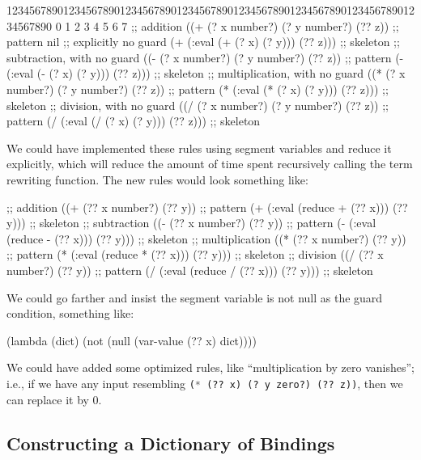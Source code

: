 \begin{lisp-example}
12345678901234567890123456789012345678901234567890123456789012345678901234567890
         0         1         2         3         4         5         6         7
;; addition
((+ (? x number?) (? y number?) (?? z)) ;; pattern
 nil                                    ;; explicitly no guard
 (+ (:eval (+ (? x) (? y))) (?? z)))    ;; skeleton
;; subtraction, with no guard
((- (? x number?) (? y number?) (?? z)) ;; pattern
 (- (:eval (- (? x) (? y))) (?? z)))    ;; skeleton
;; multiplication, with no guard
((* (? x number?) (? y number?) (?? z)) ;; pattern
 (* (:eval (* (? x) (? y))) (?? z)))    ;; skeleton
;; division, with no guard
((/ (? x number?) (? y number?) (?? z)) ;; pattern
 (/ (:eval (/ (? x) (? y))) (?? z)))    ;; skeleton
\end{lisp-example}

\begin{remark}
We could have implemented these rules using segment variables and reduce
it explicitly, which will reduce the amount of time spent recursively
calling the term rewriting function. The new rules would look something like:
\begin{lisp-example}
;; addition
((+ (?? x number?) (?? y))              ;; pattern
 (+ (:eval (reduce + (?? x))) (?? y)))  ;; skeleton
;; subtraction
((- (?? x number?) (?? y))              ;; pattern
 (- (:eval (reduce - (?? x))) (?? y)))  ;; skeleton
;; multiplication
((* (?? x number?) (?? y))              ;; pattern
 (* (:eval (reduce * (?? x))) (?? y)))  ;; skeleton
;; division
((/ (?? x number?) (?? y))              ;; pattern
 (/ (:eval (reduce / (?? x))) (?? y)))  ;; skeleton
\end{lisp-example}
We could go farther and insist the segment variable is not null as the
guard condition, something like:
\begin{lisp-example}
(lambda (dict) (not (null (var-value (?? x) dict))))
\end{lisp-example}
\end{remark}

\begin{remark}
We could have added some optimized rules, like ``multiplication by zero
vanishes''; i.e., if we have any input
resembling \lstinline[language=lisp]{(* (?? x) (? y zero?) (?? z))},
then we can replace it by $0$.
\end{remark}

\subsection{Constructing a Dictionary of Bindings}

